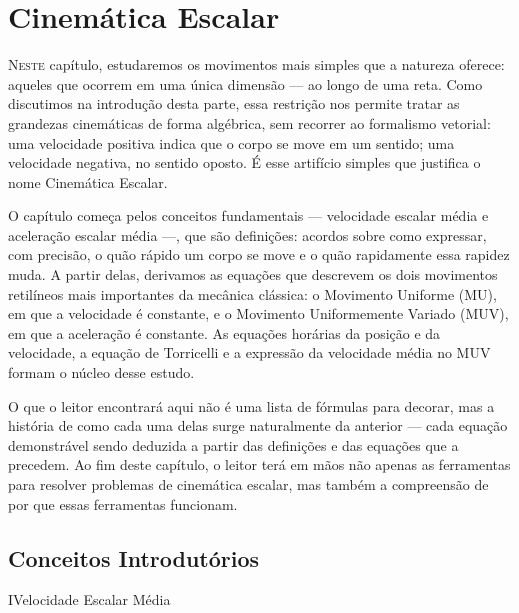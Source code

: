 
\chapter{Cinemática Escalar}

\lettrine{N}{este} capítulo, estudaremos os movimentos mais simples que a natureza oferece: aqueles que ocorrem em uma única dimensão — ao longo de uma reta. Como discutimos na introdução desta parte, essa restrição nos permite tratar as grandezas cinemáticas de forma algébrica, sem recorrer ao formalismo vetorial: uma velocidade positiva indica que o corpo se move em um sentido; uma velocidade negativa, no sentido oposto. É esse artifício simples que justifica o nome Cinemática Escalar.



O capítulo começa pelos conceitos fundamentais — velocidade escalar média e aceleração escalar média —, que são definições: acordos sobre como expressar, com precisão, o quão rápido um corpo se move e o quão rapidamente essa rapidez muda. A partir delas, derivamos as equações que descrevem os dois movimentos retilíneos mais importantes da mecânica clássica: o Movimento Uniforme (MU), em que a velocidade é constante, e o Movimento Uniformemente Variado (MUV), em que a aceleração é constante. As equações horárias da posição e da velocidade, a equação de Torricelli e a expressão da velocidade média no MUV formam o núcleo desse estudo.



O que o leitor encontrará aqui não é uma lista de fórmulas para decorar, mas a história de como cada uma delas surge naturalmente da anterior — cada equação demonstrável sendo deduzida a partir das definições e das equações que a precedem. Ao fim deste capítulo, o leitor terá em mãos não apenas as ferramentas para resolver problemas de cinemática escalar, mas também a compreensão de por que essas ferramentas funcionam.






\newpage


\section{Conceitos Introdutórios}


\begin{secnivel}{I}{Velocidade Escalar Média}
  

\end{secnivel}





